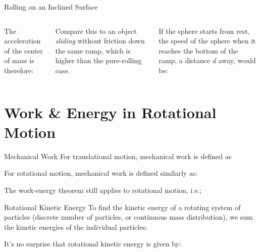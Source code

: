 \documentclass[12pt,compress,aspectratio=169]{beamer}
\begin{document}
\begin{frame}{Rolling on an Inclined Surface}
  \begin{columns}
    

    The acceleration of the center of mass is therefore:


    \vspace{-.1in}Compare this to an object \emph{sliding} without friction
    down the same ramp, which is higher than the pure-rolling case.
    
    
    \vspace{-.2in}If the sphere starts from rest, the speed of the sphere when
    it reaches the bottom of the ramp, a distance $d$ away, would be:

  \end{columns}
\end{frame}



\section{Work \& Energy in Rotational Motion}

\begin{frame}{Mechanical Work}
  For translational motion, mechanical work is defined as


  For rotational motion, mechanical work is defined similarly as:


  The work-energy theorem still applies to rotational motion, i.e.;

\end{frame}



\begin{frame}{Rotational Kinetic Energy}
  To find the kinetic energy of a rotating system of particles (discrete number
  of particles, or continuous mass distribution), we sum the
  kinetic energies of the individual particles:
    
  
  It's no surprise that rotational kinetic energy is given by:
  
\end{frame}
\end{document}
